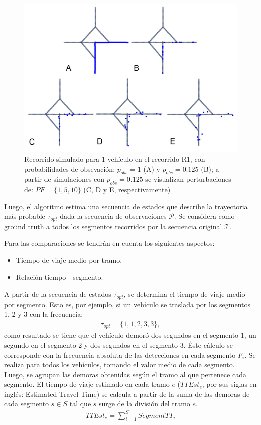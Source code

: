 \begin{figure}[!htp]
	\centering
	\includegraphics[width=0.9\linewidth]{images/result-pobspf.png}
	\captionsetup{width=0.8\linewidth}
	\caption{Recorrido simulado para 1 vehículo en el recorrido R1, con probabilidades de obsevación: $p_{obs}=1$ (A) y $p_{obs}=0.125$ (B); a partir de simulaciones con $p_{obs}=0.125$ se visualizan perturbaciones de: $PF=\{1, 5, 10\}$ (C, D y E, respectivamente) }
    \label{fig:result-pobs-pf}
\end{figure}

Luego, el algoritmo estima una secuencia de estados que describe la trayectoria más probable $\tau_{opt}$ dada la secuencia de observaciones \(\mathcal{P}\). Se considera como ground truth a todos los segmentos recorridos por la secuencia original \(\mathcal{T}\).

Para las comparaciones se tendrán en cuenta los siguientes aspectos:

\begin{itemize}
    \item Tiempo de viaje medio por tramo.
    \item Relación tiempo - segmento.
\end{itemize}

A partir de la secuencia de estados $\tau_{opt}$, se determina el tiempo de viaje medio por segmento. Esto es, por ejemplo, si un vehículo se traslada por los segmentos 1, 2 y 3 con la frecuencia:
\begin{align*}
\tau_{opt} = \{1, 1, 2, 3, 3\},
\end{align*}
como resultado se tiene que el vehículo demoró dos segundos en el segmento 1, un segundo en el segmento 2 y dos segundos en el segmento 3. Éste cálculo se corresponde con la frecuencia absoluta de las detecciones en cada segmento $F_i$. Se realiza para todos los vehículos, tomando el valor medio de cada segmento. Luego, se agrupan las demoras obtenidas según el tramo al que pertenece cada segmento. El tiempo de viaje estimado en cada tramo $e$ ($TTEst_e$, por sus siglas en inglés: Estimated Travel Time) se calcula a partir de la suma de las demoras de cada segmento $s \in S$ tal que $s$ surge de la división del tramo $e$.
\begin{align}
TTEst_e = \sum_{i=1}^S SegmentTT_i
\end{align}

